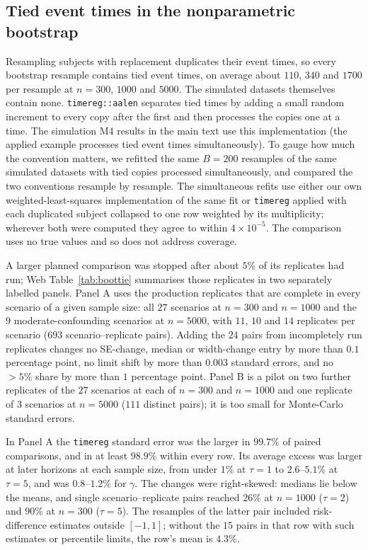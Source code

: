 \subsection{Tied event times in the nonparametric bootstrap}
\label{app:boottie}
Resampling subjects with replacement duplicates their event times, so every
bootstrap resample contains tied event times, on average about $110$, $340$ and
$1700$ per resample at $n=300$, $1000$ and $5000$. The simulated datasets
themselves contain none. \texttt{timereg::aalen} separates tied times by adding a
small random increment to every copy after the first and then processes the copies
one at a time. The simulation M4 results in the main text use this implementation (the applied example processes tied event times simultaneously). To gauge how
much the convention matters, we refitted the same $B=200$ resamples of the same
simulated datasets with tied copies processed simultaneously, and compared the two
conventions resample by resample. The simultaneous refits use either our own
weighted-least-squares implementation of the same fit or \texttt{timereg} applied with
each duplicated subject collapsed to one row weighted by its multiplicity; wherever
both were computed they agree to within $4\times10^{-5}$. The comparison uses no true values and so does not
address coverage.

A larger planned comparison was stopped after about $5\%$ of its replicates had run;
Web Table~\ref{tab:boottie} summarises those replicates in two separately labelled
panels. Panel A uses the production replicates that are complete in every scenario of
a given sample size: all $27$ scenarios at $n=300$ and $n=1000$ and the $9$
moderate-confounding scenarios at $n=5000$, with $11$, $10$ and $14$ replicates per
scenario ($693$ scenario--replicate pairs). Adding the $24$ pairs from incompletely
run replicates changes no SE-change, median or width-change entry by more than $0.1$
percentage point, no limit shift by more than $0.003$ standard errors, and no
${>}5\%$ share by more than $1$ percentage point. Panel B is a pilot on two further
replicates of the $27$ scenarios at each of $n=300$ and $n=1000$ and one replicate of
$3$ scenarios at $n=5000$ ($111$ distinct pairs); it is too small for Monte-Carlo
standard errors.

In Panel A the \texttt{timereg} standard error was the larger in $99.7\%$ of paired
comparisons, and in at least $98.9\%$ within every row. Its average excess was larger
at later horizons at each sample size, from under $1\%$ at $\tau=1$ to $2.6$--$5.1\%$
at $\tau=5$, and was $0.8$--$1.2\%$ for $\gamma$. The changes were right-skewed:
medians lie below the means, and single scenario--replicate pairs reached $26\%$ at
$n=1000$ ($\tau=2$) and $90\%$ at $n=300$ ($\tau=5$). The resamples of the latter
pair included risk-difference estimates outside $[-1,1]$; without the $15$ pairs
in that row with such estimates or percentile limits, the row's mean is $4.3\%$.

